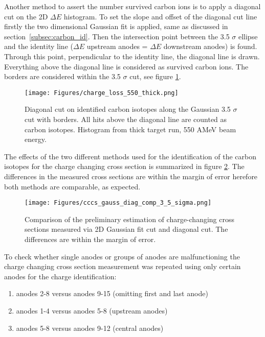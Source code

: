 \begin{appendices}
Another method to assert the number survived carbon ions is to apply a diagonal cut on the 2D $\Delta E$ histogram. To set the slope and offset of the diagonal cut line firstly the two dimensional Gaussian fit is applied, same as discussed in section~\ref{subsec:carbon_id}. Then the intersection point between the 3.5 $\sigma$ ellipse and the identity line ($\Delta E$ upstream anodes = $\Delta E$ downstream anodes) is found. Through this point, perpendicular to the identity line, the diagonal line is drawn. Everything above the diagonal line is considered as survived carbon ions. The borders are considered within the 3.5 $\sigma$ cut, see figure \ref{fig:diagonal_cut_twim}. 
\begin{figure}[htpb]
    \centering
    \texttt{[image: Figures/charge\_loss\_550\_thick.png]}
    \caption{
    Diagonal cut on identified carbon isotopes along the Gaussian 3.5 $\sigma$ cut with borders. All hits above the diagonal line are counted as carbon isotopes. Histogram from thick target run, 550 AMeV beam energy.
     }
    \label{fig:diagonal_cut_twim}
\end{figure}
The effects of the two different methods used for the identification of the carbon isotopes for the charge changing cross section is summarized in figure \ref{fig:cccs_gaus_vs_diag}. The differences in the measured cross sections are within the margin of error herefore both methods are comparable, as expected.\newline
\newline
\newline
\begin{figure}[h!]
    \centering
    \texttt{[image: Figures/cccs\_gauss\_diag\_comp\_3\_5\_sigma.png]}
    \caption{
    Comparison of the preliminary estimation of charge-changing cross sections measured via 2D Gaussian fit cut and diagonal cut. The differences are within the margin of error.
     }
    \label{fig:cccs_gaus_vs_diag}
\end{figure}
To check whether single anodes or groups of anodes are malfunctioning the charge changing cross section measurement was repeated using only certain anodes for the charge identification:
\begin{enumerate}[label=\alph*)]
\itemsep0em
\item anodes 2-8 versus anodes 9-15 (omitting first and last anode)
\item anodes 1-4 versus anodes 5-8 (upstream anodes)
\item anodes 5-8 versus anodes 9-12 (central anodes)

\end{enumerate}
\end{appendices}
